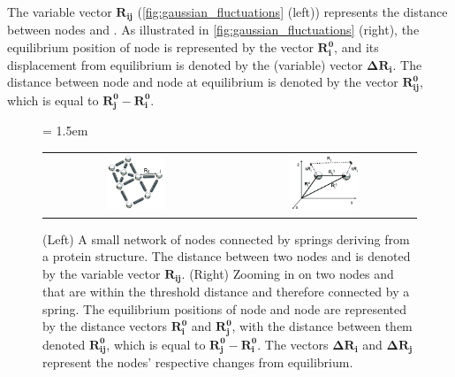 The variable vector $\mathbf{R_{ij}}$ (\autoref{fig:gaussian_fluctuations} (left)) represents the distance between nodes  and . As illustrated in \autoref{fig:gaussian_fluctuations} (right), the equilibrium position of node  is represented by the vector $\mathbf{R_i^0}$, and its displacement from equilibrium is denoted by the (variable) vector $ \mathbf{\Delta R_i}$. The distance between node  and node  at equilibrium is denoted by the vector $\mathbf{R_{ij}^0}$, which is equal to $\mathbf{R_j^0} - \mathbf{R_i^0}$.

\begin{figure}[h]
	\centering
	\tabcolsep = 1.5em
	\mySfFamily
	\begin{tabular}{c c}
		\includegraphics[width = 0.33\textwidth]{../images_CMYK/gaussian_network_small} & \includegraphics[width = 0.4\textwidth]{../images_CMYK/gaussian_network_vectors}
	\end{tabular}
	\caption{(Left) A small network of nodes connected by springs deriving from a protein structure. The distance between two nodes  and  is denoted by the variable vector $\textbf{R}_\textbf{ij}$. (Right) Zooming in on two nodes  and  that are within the threshold distance and therefore connected by a spring. The equilibrium positions of node  and node  are represented by the distance vectors $ \textbf{R}_\textbf{i}^\textbf{0} $ and $\textbf{R}_\textbf{j}^\textbf{0}$, with the distance between them denoted $\textbf{R}_{\textbf{ij}}^\textbf{0}$, which is equal to $\textbf{R}_\textbf{j}^\textbf{0} - \textbf{R}_\textbf{i}^\textbf{0}$. The vectors $\mathbf{\Delta} \textbf{R}_\textbf{i} $ and $ \mathbf{\Delta} \textbf{R}_\textbf{j}$ represent the nodes' respective changes from equilibrium.}
	\label{fig:gaussian_fluctuations}
\end{figure}

